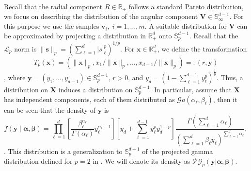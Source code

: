 Recall that the radial component $R \in {\mathbb R}_+$ follows a standard 
    Pareto distribution, we focus on describing the distribution of the angular 
    component $\bm{V}\in {\mathbb S}_{\infty}^{d-1}$. For this purpose we use the 
    samples  $\bm{v}_i ,\; i=1, \ldots ,m$. A suitable distribution for $\bm{V}$ 
    can be approximated by projecting a distribution in $\mathbb{R}_+^d$ onto 
    $\mathbb{S}_{p}^{d-1}$. Recall that the $\mathcal{L}_p$ norm is 
    $\lVert \bm{s} \rVert_p = (\sum_{\ell = 1}^d \rvert s\lvert_{\ell}^p)^{1/p}$. For 
    $\bm{x} \in\mathbb{R}_+^d$, we define the transformation 
    \[T_p(\bm{x}) = (\lVert\bm{x}\rVert_p, x_1/\lVert\bm{x}\rVert_p, \ldots, 
    x_{d-1}/\lVert\bm{x}\rVert_p)=: (r,\bm{y})\], where
    $\bm{y} = (y_1, \ldots , y_{d-1}) \in \mathbb{S}_{p}^{d-1}$, $r>0$, and 
    $y_d = \left(1 - \sum_{\ell = 1}^{d-1}y_\ell^p\right)^{\frac{1}{p}}$.
    Thus, a distribution on $\bm{X}$ induces a distribution on $\mathbb{S}_{p}^{d-1}$. 
    In particular, assume that $\bm{X}$ has independent components, each of 
    them distributed as $\mathcal{G}a(\alpha_{\ell}, \beta_{\ell})$, then it can 
    be seen that the density of $\bm{y}$ is
    \begin{equation}
        \label{eqn:projgamma}
        f(\bm{ y}\mid\bm{ \alpha},\bm{ \beta}) =
            \prod_{\ell = 1}^d\left[
                \frac{\beta_{\ell}^{\alpha_{\ell}}}{\Gamma(\alpha_{\ell})}
                y_{\ell}^{\alpha_{\ell} - 1}
                \right]
            \left[y_d +
                {\textstyle \sum}_{\ell = 1}^{d-1}y_{\ell}^py_d^{1 - p}
                \right]
            \frac{\Gamma({\textstyle\sum}_{\ell = 1}^d\alpha_{\ell})}{
                    \left({\textstyle\sum}_{\ell = 1}^d
                \beta_{\ell}y_{\ell}\right)^{{\scriptstyle\sum_{\ell = 1}^d \alpha_{\ell}}}
                },
  \end{equation}
    \citep[see,][for details]{trubey:pg}. This distribution is a generalization to $\mathbb{S}_{p}^{d-1}$
    of the projected gamma distribution defined for $p=2$ in \cite{nunez2019}. We will denote its
    density as  $\mathcal{PG}_p(\bm{y}|\bm{\alpha},\bm{\beta})$.

